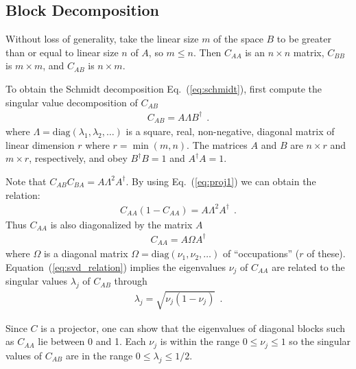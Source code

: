 \documentclass[aps, superscriptaddress, floatfix, onecolumn]{revtex4-2}
\begin{document}
\subsection{Block Decomposition}

Without loss of generality, take the linear size $m$ of the space $B$ to be greater than or equal to linear size $n$ of $A$, so $m \leq n$.
Then $C_{AA}$ is an $n \times n$ matrix, $C_{BB}$ is $m \times m$, and $C_{AB}$ is $n \times m$.

To obtain the Schmidt decomposition Eq.~(\ref{eq:schmidt}), first compute the singular value decomposition of $C_{AB}$
\begin{align}
C_{AB} = A \Lambda B^\dagger \ \ .
\end{align}
where $\Lambda = \text{diag}(\lambda_1, \lambda_2, \ldots)$ is a square, real, non-negative, diagonal matrix of linear dimension $r$ where
$r = \min(m,n)$.
The matrices  $A$ and $B$ are $n \times r$ and $m \times r$, respectively, and obey
$B^\dagger B = 1$ and $A^\dagger A = 1$.

Note that $C_{AB} C_{BA} = A \Lambda^2 A^\dagger$. By using Eq.~(\ref{eq:proj1}) we can obtain the relation:
\begin{align}
C_{AA} (1-C_{AA}) = A \Lambda^2 A^\dagger \ \ . \label{eq:svd_relation}
\end{align}
Thus $C_{AA}$ is also diagonalized by the matrix $A$
\begin{align}
C_{AA} = A \Omega A^\dagger
\end{align}
where $\Omega$ is a diagonal matrix $\Omega = \text{diag}(\nu_1, \nu_2, \ldots)$ of ``occupations'' ($r$ of these). 
Equation~(\ref{eq:svd_relation}) implies the eigenvalues $\nu_j$ of $C_{AA}$ are related to the 
singular values $\lambda_j$ of $C_{AB}$ through 
\begin{align}
\lambda_j = \sqrt{\nu_j (1-\nu_j)} \ \ .
\end{align}

Since $C$ is a projector, one can show that the eigenvalues of diagonal blocks such as $C_{AA}$ lie between 0 and 1. 
Each $\nu_j$ is within the range $0 \leq \nu_j \leq 1$ so the singular values of $C_{AB}$ are in the range $0 \leq \lambda_j \leq 1/2$.
\end{document}
